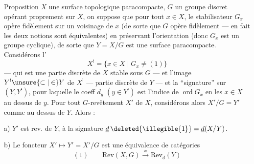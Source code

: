 \uline{Proposition} 
$X$ une surface topologique\unsure{${}^{*}$} paracompacte,
$G$ un groupe discret opérant proprement sur $X$, on suppose que pour tout
$x\in X$, le stabilisateur $G_x$ opère fidèlement sur un voisinage de $x$
(de sorte que $G$ opère fidèlement --- en fait les deux notions sont
équivalentes) en préservant l'orientation  (donc $G_x$ est
un groupe cyclique), de sorte que $Y=X/G$ est une surface paracompacte.
Considérons l'
\[
X^{!}=\{x\in X\mid G_x\ne(1)\}
\]
--- qui est une partie discrète de $X$ stable sous $G$ --- et l'image
$Y^{!}\unsure{\subset|\in}Y$ de $X^{!}$ --- partie discrète de $Y$ --- et
la ``signature'' sur $(Y,Y^{!})$, pour laquelle le coeff $d_y$ $(y\in Y^{!})$
est l'indice de  $\operatorname{ord}G_x$ en les
$x\in X$ au dessus de $y$. Pour tout $G$-revêtement $X'$ de $X$, considérons
alors $X'/G=Y'$ comme  au dessus de $Y$. Alors :


a) $Y'$ est   rev.  de $Y$,  à la signature $\underline d\,\deleted{\illegible{1}}=\underline d(X/Y)$.

b) Le foncteur $X'\longmapsto Y'=X'/G$ est une équivalence de catégories
\[
(1)\qquad \mathrm{Rev}(X,G)\overset{\approx}{\longrightarrow}\mathrm{Rev}_{\underline d}(Y)
\]

